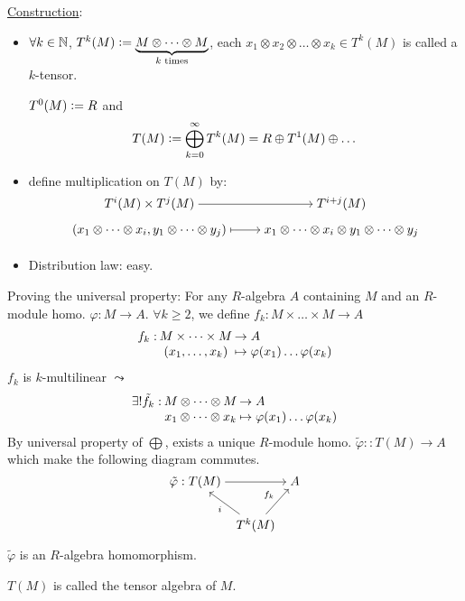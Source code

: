 \underline{Construction}:
\begin{itemize}
  \item $\forall k \in \mathbb{N}$, $T^k(M) \vcentcolon=
    \underbrace{M\otimes \dots \otimes M}_{k \text{~times}}$, each
    $x_1\otimes x_2\otimes \dots \otimes x_k \in T^k(M)$ is called a $k$-tensor.

    $T^0(M) \vcentcolon= R$ and
    \[
      T(M) \vcentcolon= \bigoplus_{k=0}^\infty T^k(M) = R \oplus T^1(M) \oplus \dots
    \]
  \item define multiplication on $T(M)$ by:
    \[
      \begin{tikzcd}[cramped, row sep=tiny]
        T^i(M) \times T^j(M) \arrow[r] & T^{i+j}(M) \\
        (x_1\otimes \dots \otimes x_i, y_1\otimes \dots \otimes y_j)
        \arrow[r, mapsto]
        & x_1\otimes \dots \otimes x_i\otimes y_1\otimes \dots\otimes y_j \\
      \end{tikzcd}
    \]
  \item Distribution law: easy.
\end{itemize}

Proving the universal property:
For any $R$-algebra $A$ containing $M$ and an $R$-module homo.
$\varphi: M \to A$.
$\forall k \ge 2$, we define
$f_k: M \times \dots \times M \to A$
\[
  \arraycolsep=1pt
  \begin{array}{rcl}
    f_k: & M \times \dots \times M & \to A \\
         & (x_1, \dots, x_k) & \mapsto
    \varphi(x_1) \dots \varphi(x_k)
  \end{array}
\]
$f_k$ is $k$-multilinear $\leadsto$
\[
  \arraycolsep=1pt
  \begin{array}{rcl}
    \exists! \tilde{f_k}: & M \otimes \dots \otimes M & \to A \\
         & x_1 \otimes \dots\otimes x_k & \mapsto
    \varphi(x_1) \dots \varphi(x_k)
  \end{array}
\]
By universal property of $\bigoplus$, exists a unique $R$-module homo.
$\tilde\varphi :: T(M) \to A$ which make the following diagram commutes.
\[
  \begin{tikzcd}[cramped, column sep=tiny]
    \tilde\varphi: T(M) \arrow{rr} & & A \\
      & T^k(M) \arrow{ul}{i} \arrow{ur}{f_k} &
  \end{tikzcd}
\]

$\tilde\varphi$ is an $R$-algebra homomorphism.

\begin{definition}
  $T(M)$ is called the tensor algebra of $M$.
\end{definition}

